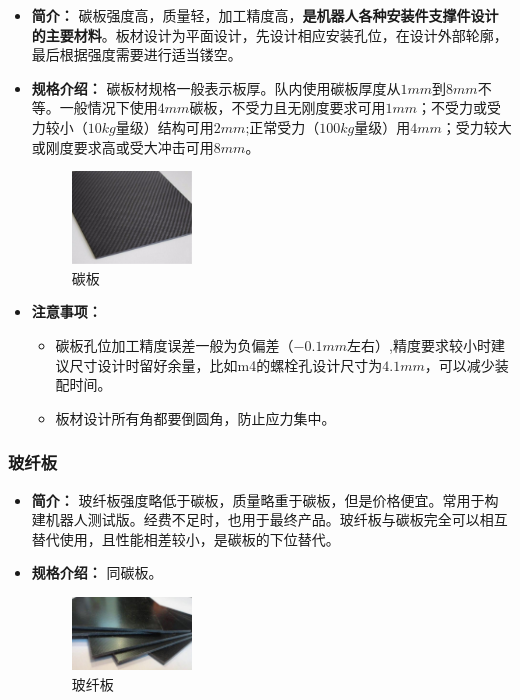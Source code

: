 \documentclass[UTF8]{article} %
\begin{document}
\begin{itemize}
  \item \textbf{简介：} 碳板强度高，质量轻，加工精度高，\textbf{是机器人各种安装件支撑件设计的主要材料}。板材设计为平面设计，先设计相应安装孔位，在设计外部轮廓，最后根据强度需要进行适当镂空。

  \item \textbf{规格介绍：} 碳板材规格一般表示板厚。队内使用碳板厚度从$1mm$到$8mm$不等。一般情况下使用$4mm$碳板，不受力且无刚度要求可用$1mm$；不受力或受力较小（$10kg$量级）结构可用$2mm$;正常受力（$100kg$量级）用$4mm$；受力较大或刚度要求高或受大冲击可用$8mm$。

  
  \begin{figure}[h]
    \centering
    \includegraphics[width=0.3\textwidth]{ban1.png}
    \caption{碳板}
  \end{figure}

  \item \textbf{注意事项：} 
  
  \begin{itemize}
    \item 碳板孔位加工精度误差一般为负偏差（$-0.1mm$左右）,精度要求较小时建议尺寸设计时留好余量，比如m4的螺栓孔设计尺寸为$4.1mm$，可以减少装配时间。
    \item 板材设计所有角都要倒圆角，防止应力集中。	
  \end{itemize}
  
\end{itemize}

\subsubsection{玻纤板}

\begin{itemize}
  \item \textbf{简介：}   玻纤板强度略低于碳板，质量略重于碳板，但是价格便宜。常用于构建机器人测试版。经费不足时，也用于最终产品。玻纤板与碳板完全可以相互替代使用，且性能相差较小，是碳板的下位替代。

  \item \textbf{规格介绍：} 同碳板。

  \begin{figure}[h]
    \centering
    \includegraphics[width=0.3\textwidth]{ban2.png}
    \caption{玻纤板}
  \end{figure}

\end{itemize}
\end{document}

